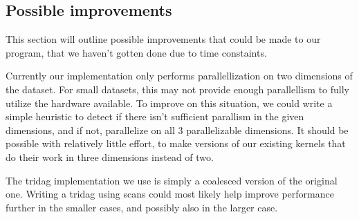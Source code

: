 \documentclass[a4paper]{article}
\begin{document}
\subsection{Possible improvements}

This section will outline possible improvements that could be made to our
program, that we haven't gotten done due to time constaints.

Currently our implementation only performs parallellization on two dimensions
of the dataset. For small datasets, this may not provide enough parallellism
to fully utilize the hardware available. To improve on this situation, we
could write a simple heuristic to detect if there isn't sufficient parallism
in the given dimensions, and if not, parallelize on all 3 parallelizable
dimensions. It should be possible with relatively little effort, to make
versions of our existing kernels that do their work in three dimensions
instead of two.

The tridag implementation we use is simply a coalesced version of the original
one. Writing a tridag using scans could most likely help improve performance
further in the smaller cases, and possibly also in the larger case.
\end{document}

